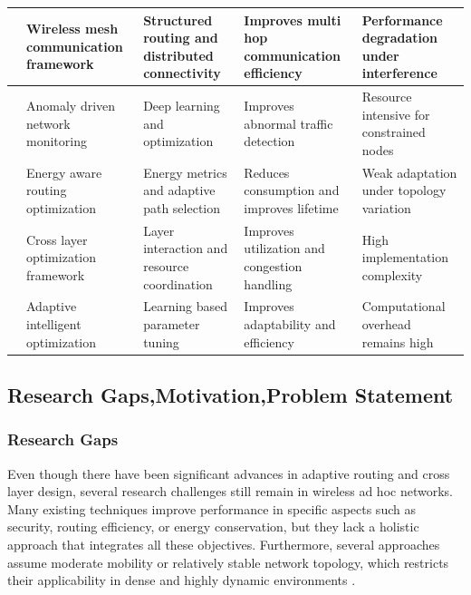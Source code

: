 \documentclass[a4paper,fleqn,final,1p]{cas-dc}
\numberwithin{equation}{section}
\begin{document}
\begin{table}[t]
\begin{tabularx}{\textwidth}{|c|X|X|X|X|}
\cite{qian2024wireless}
&
Wireless mesh communication framework
&
Structured routing and distributed connectivity
&
Improves multi hop communication efficiency
&
Performance degradation under interference
\\
\hline

\cite{esteban2023anomaly}
&
Anomaly driven network monitoring
&
Deep learning and optimization
&
Improves abnormal traffic detection
&
Resource intensive for constrained nodes
\\
\hline

\cite{adanigboa2025energy}
&
Energy aware routing optimization
&
Energy metrics and adaptive path selection
&
Reduces consumption and improves lifetime
&
Weak adaptation under topology variation
\\
\hline

\cite{prakash2024}
&
Cross layer optimization framework
&
Layer interaction and resource coordination
&
Improves utilization and congestion handling
&
High implementation complexity
\\
\hline

\cite{priya2024}
&
Adaptive intelligent optimization
&
Learning based parameter tuning
&
Improves adaptability and efficiency
&
Computational overhead remains high
\\
\hline

\end{tabularx}
\end{table}

\subsection{Research Gaps,Motivation,Problem Statement}

\subsubsection{Research Gaps}

Even though there have been significant advances in adaptive routing and cross layer design, several research challenges still remain in wireless ad hoc networks. Many existing techniques improve performance in specific aspects such as security, routing efficiency, or energy conservation, but they lack a holistic approach that integrates all these objectives. Furthermore, several approaches assume moderate mobility or relatively stable network topology, which restricts their applicability in dense and highly dynamic environments \cite{SanthoshKumar2025280,Rasulov2025116,Vastrad2025372}.
\end{document}
